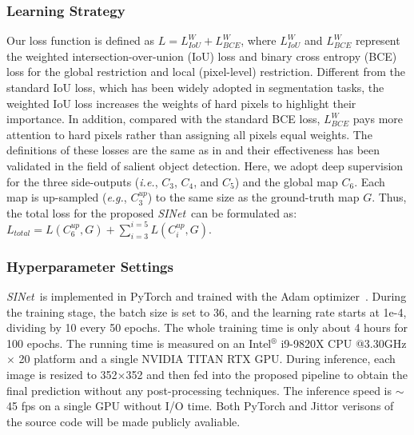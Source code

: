 \documentclass[10pt,journal,compsoc]{IEEEtran}
\def\ie{\emph{i.e.}}
\def\eg{\emph{e.g.}}
\def\ournewmodel{\emph{SINet}}
\begin{document}
\subsubsection{Learning Strategy}
%
Our loss function is defined as 
$\textit{L} = \textit{L}_{IoU}^{W} + \textit{L}_{BCE}^{W}$, 
where $\textit{L}_{IoU}^{W}$ and $\textit{L}_{BCE}^{W}$ represent 
the weighted intersection-over-union (IoU) loss and binary cross entropy (BCE) 
loss for the global restriction and local (pixel-level) restriction.
%
Different from the standard IoU loss, 
which has been widely adopted in segmentation tasks, 
the weighted IoU loss increases the weights of hard pixels 
to highlight their importance.
%
In addition, compared with the standard BCE loss, 
$\textit{L}_{BCE}^{W}$ pays more attention to hard pixels rather than 
assigning all pixels equal weights. 
%
The definitions of these losses are the same as in
\cite{qin2019basnet,wei2019f3net} and their effectiveness has been validated 
in the field of salient object detection.
%
Here, we adopt deep supervision for the three side-outputs 
(\ie, $C_3$, $C_4$, and $C_5$) and the global map $C_6$.
%
Each map is up-sampled (\eg, $C_3^{up}$) to the same size as the 
ground-truth map $G$.
%
Thus, the total loss for the proposed \ournewmodel~can be formulated as:
$\textit{L}_{total} = \textit{L} (C_6^{up}, G) + 
\sum_{i=3}^{i=5} \textit{L} (C_i^{up}, G)$.

\subsubsection{Hyperparameter Settings}
%
\ournewmodel~is implemented in PyTorch and trained with the 
Adam optimizer~\cite{kingma2015adam}.
%
During the training stage, the batch size is set to 36, 
and the learning rate starts at 1e-4, dividing by 10 every 50 epochs.
%
The whole training time is only about 4 hours for 100 epochs.
%
The running time is measured on an Intel$^\circledR$
i9-9820X CPU @3.30GHz $\times$ 20 platform and a single NVIDIA TITAN RTX GPU. 
%
During inference, each image is resized to 352$\times$352 and then fed into 
the proposed pipeline to obtain the final prediction without 
any post-processing techniques.
%
The inference speed is $\sim$45 fps on a single GPU without I/O time.
Both PyTorch \cite{paszke2019pytorch} and Jittor \cite{hu2020jittor} 
verisons of the source code will be made publicly avaliable.
\end{document}
